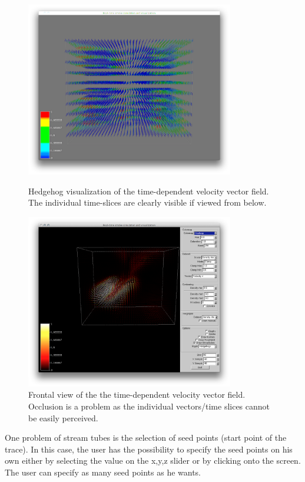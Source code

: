  \begin{figure}[htbp]
 \centering
 \begin{minipage}[t]{0.48\textwidth}
 \includegraphics[height=3in]{figures/streamtubes/30datacube_bottom.png}
 \caption{Hedgehog visualization of the time-dependent velocity vector field. The individual time-slices are clearly visible if viewed from below.}
 \label{fig:datacube_bottom}
 \end{minipage}\hspace{.04\textwidth}%
 \begin{minipage}[t]{0.48\textwidth}
 \includegraphics[height=3in]{figures/streamtubes/31datacube_front.png}
 \caption{Frontal view of the the time-dependent velocity vector field. Occlusion is a problem as the individual vectors/time slices cannot be easily perceived.}
 \label{fig:datacube_front}
 \end{minipage}
 \end{figure}
 
 
 One problem of stream tubes is the selection of seed points (start point of the trace). In  this case, the user has the possibility to specify the seed points on his own either by selecting the value on the x,y,z slider or by clicking onto the screen. The user can specify as many seed points as he wants. 
 
